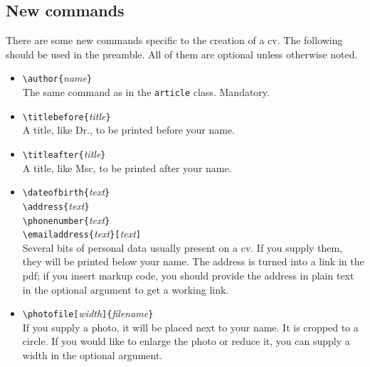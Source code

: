 \documentclass{article}
\begin{document}
\subsection{New commands}
There are some new commands specific to the creation of a cv.
The following should be used in the preamble.
All of them are optional unless otherwise noted.
\begin{itemize}
	\item \texttt{\textbackslash{}author\{}\textit{name}\texttt{\}} \\
		The same command as in the \texttt{article} class. Mandatory.
	\item \texttt{\textbackslash{}titlebefore\{}\textit{title}\texttt{\}} \\
		A title, like Dr., to be printed before your name.
	\item \texttt{\textbackslash{}titleafter\{}\textit{title}\texttt{\}} \\
		A title, like Msc, to be printed after your name.
	\item \texttt{\textbackslash{}dateofbirth\{}\textit{text}\texttt{\}} \\
	      \texttt{\textbackslash{}address\{}\textit{text}\texttt{\}} \\
	      \texttt{\textbackslash{}phonenumber\{}\textit{text}\texttt{\}} \\
	      \texttt{\textbackslash{}emailaddress\{}\textit{text}\texttt{\}[}\textit{text}\texttt{]} \\
		Several bits of personal data usually present on a cv.
		If you supply them, they will be printed below your name.
		The address is turned into a link in the pdf; if you insert markup code, you should provide the address in plain text in the optional argument to get a working link.
	\item \texttt{\textbackslash{}photofile[}\textit{width}\texttt{]\{}\textit{filename}\texttt{\}} \\
		If you supply a photo, it will be placed next to your name.
		It is cropped to a circle.
		If you would like to enlarge the photo or reduce it, you can supply a width in the optional argument.
\end{itemize}
\end{document}
